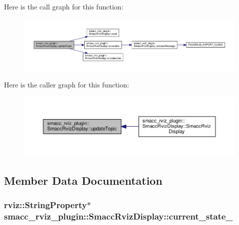 Here is the call graph for this function\+:\nopagebreak
\begin{figure}[H]
\begin{center}
\leavevmode
\includegraphics[width=350pt]{classsmacc__rviz__plugin_1_1SmaccRvizDisplay_adf332ae95bd83969b33ba713a60832fd_cgraph}
\end{center}
\end{figure}




Here is the caller graph for this function\+:\nopagebreak
\begin{figure}[H]
\begin{center}
\leavevmode
\includegraphics[width=350pt]{classsmacc__rviz__plugin_1_1SmaccRvizDisplay_adf332ae95bd83969b33ba713a60832fd_icgraph}
\end{center}
\end{figure}




\subsection{Member Data Documentation}
\subsubsection[{\texorpdfstring{current\+\_\+state\+\_\+}{current_state_}}]{\setlength{\rightskip}{0pt plus 5cm}rviz\+::\+String\+Property$\ast$ smacc\+\_\+rviz\+\_\+plugin\+::\+Smacc\+Rviz\+Display\+::current\+\_\+state\+\_\+\hspace{0.3cm}{\ttfamily [private]}}\hypertarget{classsmacc__rviz__plugin_1_1SmaccRvizDisplay_a342ff238c1dfaa427f09ee205a9e92d5}{}\label{classsmacc__rviz__plugin_1_1SmaccRvizDisplay_a342ff238c1dfaa427f09ee205a9e92d5}


